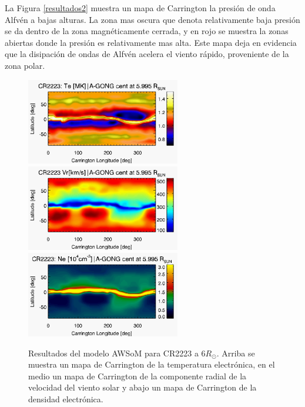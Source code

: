 \documentclass[a4paper,11pt]{report}
\begin{document}
La Figura \ref{resultados2} muestra un mapa de Carrington la presión de onda Alfvén a bajas alturas. La zona mas oscura que denota relativamente baja presión se da dentro de la zona magnéticamente cerrada, y en rojo se muestra la zonas abiertas donde la presión es relativamente mas alta. Este mapa deja en evidencia que la disipación de ondas de Alfvén acelera el viento rápido, proveniente de la zona polar.


\begin{figure}%
\begin{center}
\includegraphics[width=0.6\textwidth]{figuras/map_Te_awsom_2223_cocent_extended_5_995_Rsun.png}
\includegraphics[width=0.6\textwidth]{figuras/map_Vr_awsom_2223_cocent_extended_5_995_Rsun.png}
\includegraphics[width=0.6\textwidth]{figuras/map_Ne_awsom_2223_cocent_extended_5_995_Rsun.png}
\end{center}
\caption{Resultados del modelo AWSoM para CR2223 a $6 R_{\odot}$. Arriba se muestra un mapa de Carrington de la temperatura electrónica, en el medio un mapa de Carrington de la componente radial de la velocidad del viento solar y abajo un mapa de Carrington de la densidad electrónica.}
\label{resultados1}
\end{figure}
\end{document}
